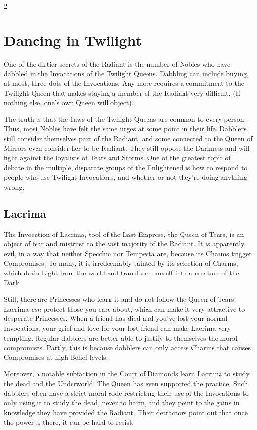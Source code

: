 \begin{multicols}{2}
\bigsidebarstart
\section*{Dancing in Twilight}

One of the dirtier secrets of the Radiant is the number of Nobles who have dabbled in the Invocations of the Twilight Queens. Dabbling can include buying, at most, three dots of the Invocations. Any more requires a commitment to the Twilight Queen that makes staying a member of the Radiant very difficult. (If nothing else, one's own Queen will object). 

The truth is that the flaws of the Twilight Queens are common to every person. Thus, most Nobles have felt the same urges at some point in their life. Dabblers still consider themselves part of the Radiant, and some connected to the Queen of Mirrors even consider her to be Radiant. They still oppose the Darkness and will fight against the loyalists of Tears and Storms. One of the greatest topic of debate in the multiple, disparate groups of the Enlightened is how to respond to people who use Twilight Invocations, and whether or not they're doing anything wrong.

\subsection*{Lacrima}
The Invocation of Lacrima, tool of the Last Empress, the Queen of Tears, is an object of fear and mistrust to the vast majority of the Radiant. It is apparently evil, in a way that neither Specchio nor Tempesta are, because its Charms trigger Compromises. To many, it is irredeemably tainted by its selection of Charms, which drain Light from the world and transform oneself into a creature of the Dark. 

Still, there are Princesses who learn it and do not follow the Queen of Tears. Lacrima \textit{can} protect those you care about, which can make it very attractive to desperate Princesses. When a friend has died and you've lost your normal Invocations, your grief and love for your lost friend can make Lacrima very tempting. Regular dabblers are better able to justify to themselves the moral compromises. Partly, this is because dabblers can only access Charms that causes Compromises at high Belief levels. 

Moreover, a notable subfaction in the Court of Diamonds learn Lacrima to study the dead and the Underworld. The Queen has even supported the practice. Such dabblers often have a strict moral code restricting their use of the Invocations to only using it to study the dead, never to harm, and they point to the gains in knowledge they have provided the Radiant. Their detractors point out that once the power is there, it can be hard to resist. 


\end{multicols}

